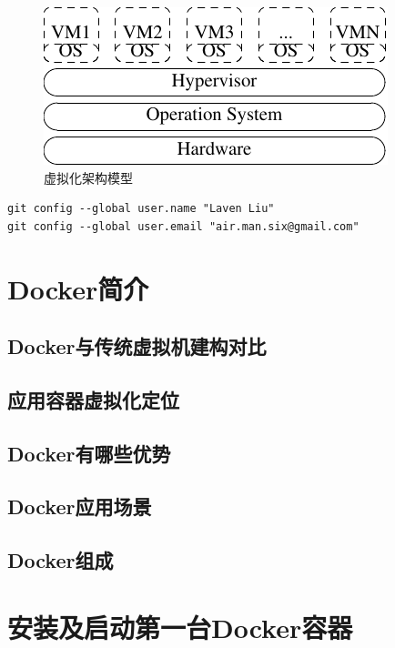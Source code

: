 \begin{figure}[!htbp]
  \centering
  \includegraphics{graph/virtualization01.pdf}
    \caption{虚拟化架构模型}
  \label{fig:virtualization}
\end{figure}

\begin{verbatim}
git config --global user.name "Laven Liu"
git config --global user.email "air.man.six@gmail.com"
\end{verbatim}

\section{Docker简介}
\label{sec:introDocker}

\subsection{Docker与传统虚拟机建构对比}
\label{sec:contrastVM}

\subsection{应用容器虚拟化定位}
\label{sec:dockerDirect}

\subsection{Docker有哪些优势}
\label{sec:dockerAdvance}

\subsection{Docker应用场景}
\label{sec:dockerSec}

\subsection{Docker组成}
\label{sec:dockerComponents}

\section{安装及启动第一台Docker容器}
\label{sec:installDocker}

